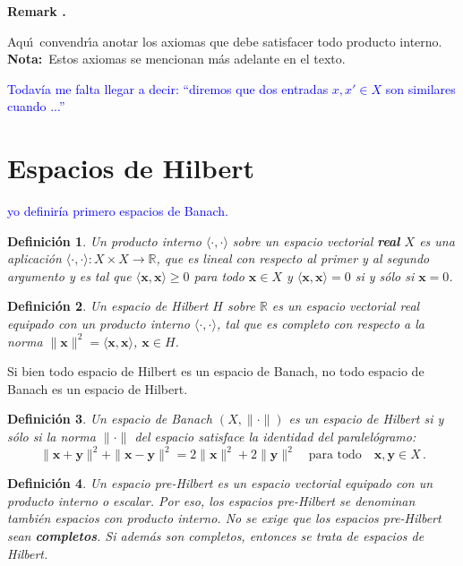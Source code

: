 \documentclass[12pt,reqno]{amsart}
\newtheorem*{mydef}{Definici\'on}
\newenvironment{mycolor}{\color{red}}{}
\newcounter{myremarkcount}
\newenvironment{myremark}
{%
\medskip
\begin{flushright}
\begin{lrbox}{\myremarkbox}%
\begin{minipage}[t]{0.9\linewidth}
\stepcounter{myremarkcount}
\footnotesize
\begin{mycolor}
{\bf Remark \arabic{myremarkcount}.}
\begin{it}
}
{%
\end{it}
\end{mycolor}
\end{minipage}
\end{lrbox}
\fbox{\usebox{\myremarkbox}}
\end{flushright}

\bigskip}
\begin{document}
\begin{myremark}
Aqu\'\i\ convendr\'\i a anotar los axiomas que debe satisfacer todo
producto interno.
{\bf Nota:}\ Estos axiomas se mencionan m\'as adelante en el texto.
\end{myremark}

\textcolor{blue}{Todav\'ia me falta llegar a decir: ``diremos que dos entradas
$x,x'\in X$ son similares cuando ...''}


\section{Espacios de Hilbert}

\textcolor{blue}{yo definir\'ia primero espacios de Banach.}

\begin{mydef}
Un producto interno $\langle\cdot,\cdot\rangle$ sobre un espacio vectorial
{\bf real} $X$ es una aplicaci\'on 
$\langle\cdot,\cdot\rangle:X\times X\to\mathbb{R}$,
que es lineal con respecto al primer y al segundo argumento
y es tal que 
$\langle\mathbf{x}, \mathbf{x}\rangle\geq0$ para todo $\mathbf{x}\in X$
y $\langle\mathbf{x}, \mathbf{x}\rangle=0$ si y s\'olo si $\mathbf{x}=0$.
\end{mydef}

\begin{mydef}
Un espacio de Hilbert $H$ sobre $\mathbb{R}$ es un espacio vectorial real
equipado con un producto interno $\langle\cdot,\cdot\rangle$, tal que
es completo con respecto a la norma
$\|\mathbf{x}\|^{2}= \langle\mathbf{x},\mathbf{x}\rangle$,
$\mathbf{x}\in H$.
\end{mydef}

Si bien todo espacio de Hilbert es un espacio de Banach, 
no todo espacio de Banach es un espacio de Hilbert.

\begin{mydef}
Un espacio de Banach $(X,\|\cdot\|)$ es un espacio de Hilbert
si y s\'olo si la norma $\|\cdot\|$ del espacio satisface la
identidad del paralel\'ogramo:
$$
\|\mathbf{x}+\mathbf{y}\|^2+\|\mathbf{x}-\mathbf{y}\|^2
= 2\|\mathbf{x}\|^2+2\|\mathbf{y}\|^2\quad
\text{para todo}\quad \mathbf{x},\mathbf{y}\in X\,.
$$
\end{mydef}

\begin{mydef}
Un espacio pre-Hilbert es un espacio vectorial equipado con un producto
interno o escalar.
Por eso, los espacios pre-Hilbert se denominan tambi\'en espacios con
producto interno.
No se exige que los espacios pre-Hilbert sean {\bf completos}.
Si adem\'as son completos, entonces se trata de espacios de Hilbert.
\end{mydef}
\end{document}
